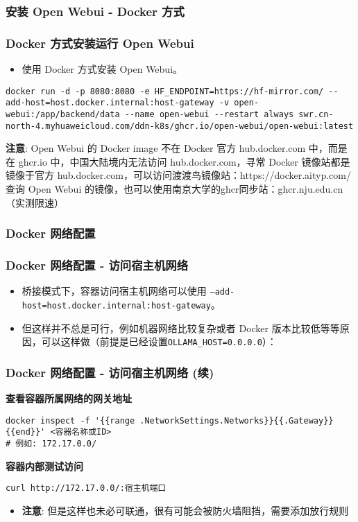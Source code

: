 \begin{frame}[fragile]
	\frametitle{安装 Open Webui - Docker 方式}
	\subsubsection{Docker 方式安装运行 Open Webui}
	\begin{itemize}
		\item 使用 Docker 方式安装 Open Webui。
	\end{itemize}
	\begin{lstlisting}
docker run -d -p 8080:8080 -e HF_ENDPOINT=https://hf-mirror.com/ --add-host=host.docker.internal:host-gateway -v open-webui:/app/backend/data --name open-webui --restart always swr.cn-north-4.myhuaweicloud.com/ddn-k8s/ghcr.io/open-webui/open-webui:latest
\end{lstlisting}
\textbf{注意}:
Open Webui 的 Docker image 不在 Docker 官方 hub.docker.com 中，而是在 ghcr.io 中，中国大陆境内无法访问 hub.docker.com，寻常 Docker 镜像站都是镜像于官方 hub.docker.com，可以访问渡渡鸟镜像站：https://docker.aityp.com/ 查询 Open Webui 的镜像，也可以使用南京大学的ghcr同步站：ghcr.nju.edu.cn （实测限速）
\end{frame}

\begin{frame}
	\frametitle{Docker 网络配置}
	\subsubsection{Docker 网络配置 - 访问宿主机网络}
	\begin{itemize}
		\item 桥接模式下，容器访问宿主机网络可以使用 \texttt{--add-host=host.docker.internal:host-gateway}。
		\item 但这样并不总是可行，例如机器网络比较复杂或者 Docker 版本比较低等等原因，可以这样做（前提是已经设置\lstinline|OLLAMA_HOST=0.0.0.0|）：
	\end{itemize}
\end{frame}

\begin{frame}[fragile]
	\frametitle{Docker 网络配置 - 访问宿主机网络 (续)}
	\textbf{查看容器所属网络的网关地址}
	\begin{lstlisting}
docker inspect -f '{{range .NetworkSettings.Networks}}{{.Gateway}}{{end}}' <容器名称或ID>
# 例如: 172.17.0.0/
\end{lstlisting}
	\textbf{容器内部测试访问}
	\begin{lstlisting}
curl http://172.17.0.0/:宿主机端口
\end{lstlisting}
	\begin{itemize}
		\item \textbf{注意}: 但是这样也未必可联通，很有可能会被防火墙阻挡，需要添加放行规则
\end{itemize}
\end{frame}

